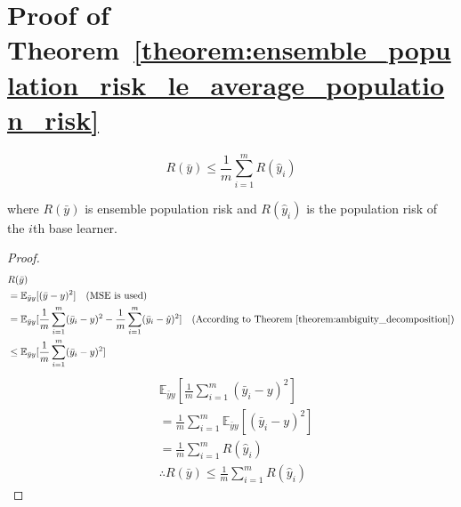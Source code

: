 \documentclass{article}
\begin{document}
\section{Proof of Theorem~\ref{theorem:ensemble_population_risk_le_average_population_risk}}
\label{appendix:ensemble_population_risk_le_average_population_risk}
\[
R(\bar{y}) \le \frac{1}{m} \sum_{i=1}^{m} R(\hat{y}_i)
\]
\begin{center}
    \begin{minipage}{0.8\linewidth}
        \small
        where $R(\bar{y})$ is ensemble population risk and $R(\hat{y}_i)$ is the population risk of the $i$th base learner. 
    \end{minipage}
    \begin{proof}
        \begin{align*}
            &R(\bar{y})
            \\
            &= \mathbb{E}_{\bar{y}y}[(\bar{y} - y)^2] \quad \text{(MSE is used)}
            \\
            &= \mathbb{E}_{\bar{y}y}[\frac{1}{m} \sum_{i = 1}^{m} (\bar{y}_i - y)^2 - \frac{1}{m} \sum_{i = 1}^{m} (\bar{y}_i - \hat{y})^2] \quad \text{(According to Theorem~\ref{theorem:ambiguity_decomposition})}
            \\
            &\leq \mathbb{E}_{\bar{y}y}[\frac{1}{m} \sum_{i = 1}^{m} (\bar{y}_i - y)^2]
        \end{align*}
        \begin{align*}
            &\mathbb{E}_{\bar{y}y}[\frac{1}{m} \sum_{i = 1}^{m} (\bar{y}_i - y)^2]
            \\
            &= \frac{1}{m} \sum_{i = 1}^{m} \mathbb{E}_{\bar{y}y}[(\bar{y}_i - y)^2]
            \\
            &= \frac{1}{m} \sum_{i = 1}^{m} R(\hat{y}_i)
            \\
            &\therefore R(\bar{y}) \leq \frac{1}{m} \sum_{i = 1}^{m} R(\hat{y}_i)
        \end{align*}
    \end{proof}
\end{center}
\end{document}
